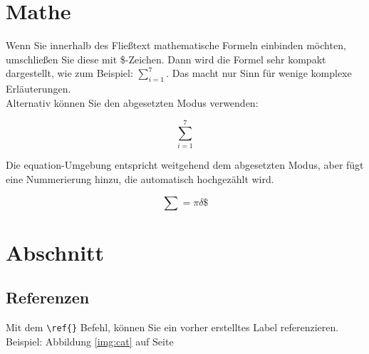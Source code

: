 \documentclass{article}
\begin{document}
\section{Mathe}

Wenn Sie innerhalb des Fließtext mathematische Formeln einbinden möchten, umschließen Sie diese mit \$-Zeichen. Dann wird die Formel sehr kompakt dargestellt, wie zum Beispiel: $\sum_{i=1}^7$. Das macht nur Sinn für wenige komplexe Erläuterungen.
\\
Alternativ können Sie den abgesetzten Modus verwenden:

\[\sum_{i=1}^7\]


\noindent Die equation-Umgebung entspricht weitgehend dem abgesetzten Modus, aber fügt eine Nummerierung hinzu, die automatisch hochgezählt wird.

\begin{equation}
\sum = \pi \delta \$			
\end{equation}

\section{Abschnitt}

\Blindtext

\subsection{Referenzen}

Mit dem \verb|\ref{}| Befehl, können Sie ein vorher erstelltes Label referenzieren. Beispiel: Abbildung \ref{img:cat} auf Seite \pageref{img:cat}
\end{document}
